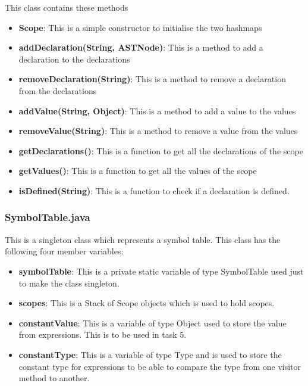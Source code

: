 \documentclass{article}
\begin{document}
			This class contains these methods
			\begin{itemize}
			\item \textbf{Scope}: This is a simple constructor to initialise the two hashmaps
			\item \textbf{addDeclaration(String, ASTNode)}: This is a method to add a declaration to the declarations
			\item \textbf{removeDeclaration(String)}: This is a method to remove a declaration from the declarations
			\item \textbf{addValue(String, Object)}: This is a method to add a value to the values
			\item \textbf{removeValue(String)}: This is a method to remove a value from the values
			\item \textbf{getDeclarations()}: This is a function to get all the declarations of the scope
			\item \textbf{getValues()}: This is a function to get all the values of the scope
			\item \textbf{isDefined(String)}: This is a function to check if a declaration is defined.
			\end{itemize}
			
				\subsubsection{SymbolTable.java}
			
			This is a singleton class which represents a symbol table. This class has the following four member variables:
			\begin{itemize}
			\item \textbf{symbolTable}: This is a private static variable of type SymbolTable used just to make the class singleton.
			\item \textbf{scopes}: This is a Stack of Scope objects which is used to hold scopes.
			\item \textbf{constantValue}: This is a variable of type Object used to store the value from expressions. This is to be used in task 5.
			\item \textbf{constantType}: This is a variable of type Type and is used to store the constant type for expressions to be able to compare the type from one visitor method to another.
			
			\end{itemize}
			
\end{document}
